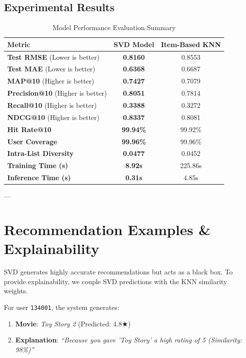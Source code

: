 \documentclass[11pt,a4paper]{article}
\begin{document}
\subsection{Experimental Results}
\begin{table}[h]
\centering
\caption{Model Performance Evaluation Summary}
\begin{tabular}{lcc}
\toprule
\textbf{Metric} & \textbf{SVD Model} & \textbf{Item-Based KNN} \\
\midrule
\textbf{Test RMSE} (Lower is better) & \textbf{0.8160} & 0.8553 \\
\textbf{Test MAE} (Lower is better) & \textbf{0.6368} & 0.6687 \\
\textbf{MAP@10} (Higher is better) & \textbf{0.7427} & 0.7079 \\
\textbf{Precision@10} (Higher is better) & \textbf{0.8051} & 0.7814 \\
\textbf{Recall@10} (Higher is better) & \textbf{0.3388} & 0.3272 \\
\textbf{NDCG@10} (Higher is better) & \textbf{0.8337} & 0.8081 \\
\textbf{Hit Rate@10} & \textbf{99.94\%} & 99.92\% \\
\textbf{User Coverage} & \textbf{99.96\%} & 99.96\% \\
\textbf{Intra-List Diversity} & \textbf{0.0477} & 0.0452 \\
\textbf{Training Time (s)} & \textbf{8.92s} & 225.86s \\
\textbf{Inference Time (s)} & \textbf{0.31s} & 4.85s \\
\bottomrule
\end{tabular}
\label{tab:results}
\end{table}

---

\section{Recommendation Examples \& Explainability}
SVD generates highly accurate recommendations but acts as a black box. To provide explainability, we couple SVD predictions with the KNN similarity weights.

For user \texttt{134001}, the system generates:
\begin{enumerate}
    \item \textbf{Movie}: \textit{Toy Story 2} (Predicted: 4.8★)
    \item \textbf{Explanation}: \textit{``Because you gave 'Toy Story' a high rating of 5 (Similarity: 98\%)''}
\end{enumerate}
\end{document}
